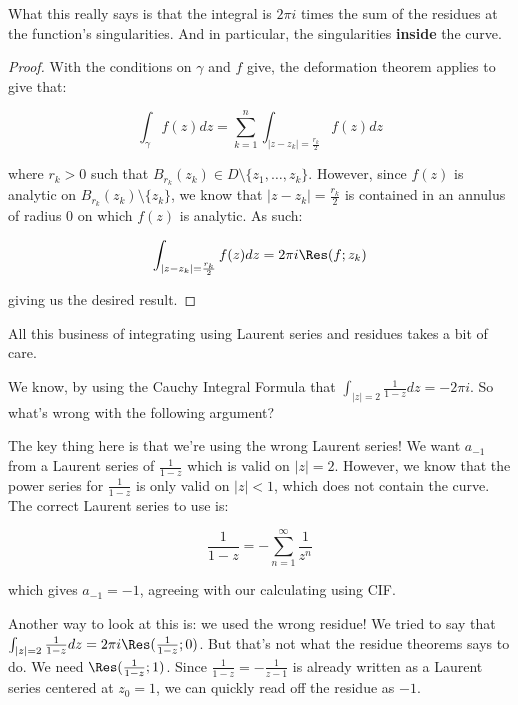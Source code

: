 What this really says is that the integral is $2\pi i$ times the sum of the residues at the function's singularities. And in particular, the singularities {\bf inside} the curve.

\begin{proof} With the conditions on $\gamma$ and $f$ give, the deformation theorem applies to give that:

$$\int_{\gamma} f(z)dz = \sum_{k=1}^n \int_{|z-z_k| = \frac{r_k}{2}} f(z)dz$$

\noin where $r_k > 0$ such that $B_{r_k}(z_k)\in D\setminus\{z_1,\dots,z_k\}$. However, since $f(z)$ is analytic on $B_{r_k}(z_k)\setminus\{z_k\}$, we know that $|z-z_k| = \frac{r_k}{2}$ is contained in an annulus of radius $0$ on which $f(z)$ is analytic. As such:

$$\int_{|z-z_k| = \frac{r_k}{2}} f(z)dz = 2\pi i \Res(f;z_k)$$

\noin giving us the desired result.

\end{proof}

All this business of integrating using Laurent series and residues takes a bit of care. 

\begin{ex}{}{} We know, by using the Cauchy Integral Formula that $\int_{|z| = 2} \frac{1}{1-z}dz = -2\pi i$. So what's wrong with the following argument?


The key thing here is that we're using the wrong Laurent series! We want $a_{-1}$ from a Laurent series of $\frac{1}{1-z}$ which is valid on $|z| = 2$. However, we know that the power series for $\frac{1}{1-z}$ is only valid on $|z| < 1$, which does not contain the curve. The correct Laurent series to use is:

$$\frac{1}{1-z} = -\sum_{n = 1}^\infty \frac{1}{z^n}$$

\noin which gives $a_{-1} = -1$, agreeing with our calculating using CIF.

Another way to look at this is: we used the wrong residue! We tried to say that $\int_{|z|  = 2} \frac{1}{1-z}dz = 2\pi i\Res(\frac{1}{1-z};0)$. But that's not what the residue theorems says to do. We need $\Res(\frac{1}{1-z};1)$. Since $\frac{1}{1-z} = -\frac{1}{z-1}$ is already written as a Laurent series centered at $z_0 = 1$, we can quickly read off the residue as $-1$.

\end{ex}

